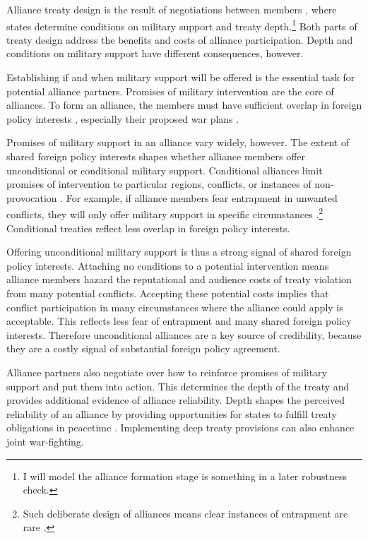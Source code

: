 \documentclass[12pt]{article}
\begin{document}
Alliance treaty design is the result of negotiations between members \citep{Poast2019a}, where states determine conditions on military support and treaty depth.\footnote{I will model the alliance formation stage is something in a later robustness check.}
Both parts of treaty design address the benefits and costs of alliance participation. 
Depth and conditions on military support have different consequences, however. 


Establishing if and when military support will be offered is the essential task for potential alliance partners. 
Promises of military intervention are the core of alliances. 
To form an alliance, the members must have sufficient overlap in foreign policy interests \citep{Morrow1991, Smith1995, FordhamPoast2014}, especially their proposed war plans \citep{Poast2019a}.  


Promises of military support in an alliance vary widely, however. 
The extent of shared foreign policy interests shapes whether alliance members offer unconditional or conditional military support.
Conditional alliances limit promises of intervention to particular regions, conflicts, or instances of non-provocation \citep{Leedsetal2000}. 
For example, if alliance members fear entrapment in unwanted conflicts, they will only offer military support in specific circumstances \citep{Kim2011, Benson2012}.\footnote{Such deliberate design of alliances means clear instances of entrapment are rare \citep{Kim2011, Beckley2015}.} 
Conditional treaties reflect less overlap in foreign policy interests. 


Offering unconditional military support is thus a strong signal of shared foreign policy interests. 
Attaching no conditions to a potential intervention means alliance members hazard the reputational \citep{Gibler2008, Crescenzietal2012} and audience \citep{Fearon1997} costs of treaty violation from many potential conflicts. 
Accepting these potential costs implies that conflict participation in many circumstances where the alliance could apply is acceptable.
This reflects less fear of entrapment and many shared foreign policy interests. 
Therefore unconditional alliances are a key source of credibility, because they are a costly signal of substantial foreign policy agreement. 


Alliance partners also negotiate over how to reinforce promises of military support and put them into action. 
This determines the depth of the treaty and provides additional evidence of alliance reliability. 
Depth shapes the perceived reliability of an alliance by providing opportunities for states to fulfill treaty obligations in peacetime \citep{Morrow1994}. 
Implementing deep treaty provisions can also enhance joint war-fighting. 
\end{document}
